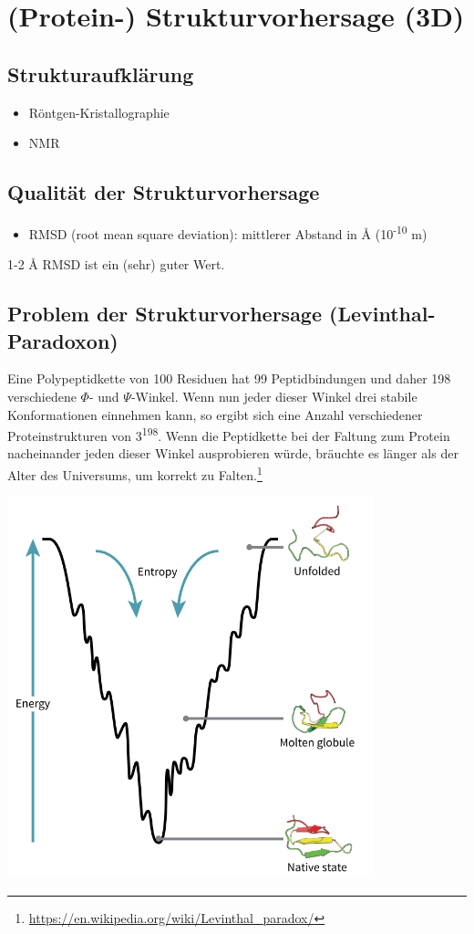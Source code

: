 \section{(Protein-) Strukturvorhersage (3D)}
\subsection{Strukturaufklärung}
\begin{itemize}
  \item Röntgen-Kristallographie
  \item NMR
\end{itemize}
\subsection{Qualität der Strukturvorhersage}
\begin{itemize}
\item RMSD (root mean square deviation): mittlerer Abstand in \AA{} (10\textsuperscript{-10} m)
\end{itemize}
1-2 \AA{} RMSD ist ein (sehr) guter Wert.
\subsection{Problem der Strukturvorhersage (Levinthal-Paradoxon)}
Eine Polypeptidkette von 100 Residuen hat 99 Peptidbindungen und daher 198 verschiedene $\Phi$- und $\Psi$-Winkel.
Wenn nun jeder dieser Winkel drei stabile Konformationen einnehmen kann, 
so ergibt sich eine Anzahl verschiedener Proteinstrukturen von 3\textsuperscript{198}.
Wenn die Peptidkette bei der Faltung zum Protein nacheinander jeden dieser Winkel ausprobieren würde, 
bräuchte es länger als der Alter des Universums, um korrekt zu Falten.\footnote{\url{https://en.wikipedia.org/wiki/Levinthal_paradox/}}


\includegraphics[width=0.8\textwidth]{lectures/160606/pix/Folding_funnel_schematic.png}



